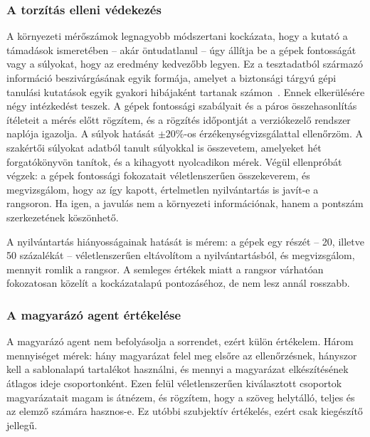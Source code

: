 \subsubsection{A torzítás elleni védekezés}\label{sec:torzitas}
A környezeti mérőszámok legnagyobb módszertani kockázata, hogy a kutató a támadások ismeretében -- akár öntudatlanul -- úgy állítja be a gépek fontosságát vagy a súlyokat, hogy az eredmény kedvezőbb legyen. Ez a tesztadatból származó információ beszivárgásának egyik formája, amelyet a biztonsági tárgyú gépi tanulási kutatások egyik gyakori hibájaként tartanak számon~\cite{arp2022}. Ennek elkerülésére négy intézkedést teszek. A gépek fontossági szabályait és a páros összehasonlítás ítéleteit a mérés előtt rögzítem, és a rögzítés időpontját a verziókezelő rendszer naplója igazolja. A súlyok hatását $\pm 20\%$-os érzékenységvizsgálattal ellenőrzöm. A szakértői súlyokat adatból tanult súlyokkal is összevetem, amelyeket hét forgatókönyvön tanítok, és a kihagyott nyolcadikon mérek. Végül ellenpróbát végzek: a gépek fontossági fokozatait véletlenszerűen összekeverem, és megvizsgálom, hogy az így kapott, értelmetlen nyilvántartás is javít-e a rangsoron. Ha igen, a javulás nem a környezeti információnak, hanem a pontszám szerkezetének köszönhető.

A nyilvántartás hiányosságainak hatását is mérem: a gépek egy részét -- 20, illetve 50 százalékát -- véletlenszerűen eltávolítom a nyilvántartásból, és megvizsgálom, mennyit romlik a rangsor. A semleges értékek miatt a rangsor várhatóan fokozatosan közelít a kockázatalapú pontozáséhoz, de nem lesz annál rosszabb.

\subsubsection{A magyarázó agent értékelése}
A magyarázó agent nem befolyásolja a sorrendet, ezért külön értékelem. Három mennyiséget mérek: hány magyarázat felel meg elsőre az ellenőrzésnek, hányszor kell a sablonalapú tartalékot használni, és mennyi a magyarázat elkészítésének átlagos ideje csoportonként. Ezen felül véletlenszerűen kiválasztott csoportok magyarázatait magam is átnézem, és rögzítem, hogy a szöveg helytálló, teljes és az elemző számára hasznos-e. Ez utóbbi szubjektív értékelés, ezért csak kiegészítő jellegű.

